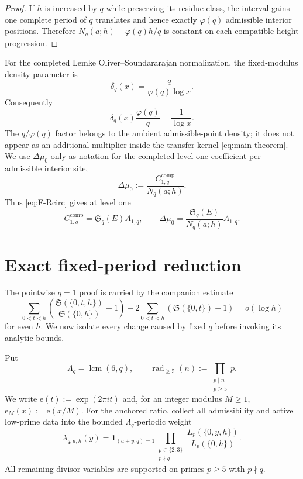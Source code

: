 \documentclass[11pt]{article}
\theoremstyle{definition}
\theoremstyle{remark}
\newcommand{\SSer}{\mathfrak S}
\newcommand{\1}{\mathbf 1}
\newcommand{\e}{\mathrm e}
\newcommand{\ph}{\varphi}
\begin{document}
\begin{proof}
If $h$ is increased by $q$ while preserving its residue class, the interval gains one complete period of $q$ translates and hence exactly $\ph(q)$ admissible interior positions.  Therefore $N_q(a;h)-\ph(q)h/q$ is constant on each compatible height progression.
\end{proof}

For the completed Lemke Oliver--Soundararajan normalization, the fixed-modulus density parameter is
\begin{equation}\label{eq:deltaq}
\delta_q(x)=\frac{q}{\ph(q)\log x}.
\end{equation}
Consequently
\[
\delta_q(x)\frac{\ph(q)}q=\frac1{\log x}.
\]
The $q/\ph(q)$ factor belongs to the ambient admissible-point density; it does not appear as an additional multiplier inside the transfer kernel \eqref{eq:main-theorem}.  We use $\Delta\mu_0$ only as notation for the completed level-one coefficient per admissible interior site,
\[
\Delta\mu_0:=\frac{C_{1,q}^{\mathrm{comp}}}{N_q(a;h)}.
\]
Thus \eqref{eq:F-Rcirc} gives at level one
\begin{equation}\label{eq:LOS-level-one}
C_{1,q}^{\mathrm{comp}}=\SSer_q(E)A_{1,q},
\qquad
\Delta\mu_0=\frac{\SSer_q(E)}{N_q(a;h)}A_{1,q}.
\end{equation}

\section{Exact fixed-period reduction}\label{sec:fixed-period}

The pointwise $q=1$ proof is carried by the companion estimate
\begin{equation}\label{eq:q1-input}
\sum_{0<t<h}\left(
\frac{\SSer(\{0,t,h\})}{\SSer(\{0,h\})}-1
\right)
-2\sum_{0<t<h}(\SSer(\{0,t\})-1)
=o(\log h)
\end{equation}
for even $h$.  We now isolate every change caused by fixed $q$ before invoking its analytic bounds.

Put
\[
\Lambda_q=\operatorname{lcm}(6,q),
\qquad
\operatorname{rad}_{\ge5}(n):=\prod_{\substack{p\mid n\\p\ge5}}p.
\]
We write $\e(t):=\exp(2\pi i t)$ and, for an integer modulus $M\ge1$,
$\e_M(x):=\e(x/M)$.  For the anchored ratio, collect all admissibility and active low-prime data into the bounded $\Lambda_q$-periodic weight
\begin{equation}\label{eq:lambdaq}
\lambda_{q,a,h}(y)
=\1_{(a+y,q)=1}
\prod_{\substack{p\in\{2,3\}\\p\nmid q}}
\frac{L_p(\{0,y,h\})}{L_p(\{0,h\})}.
\end{equation}
All remaining divisor variables are supported on primes $p\ge5$ with $p\nmid q$.
\end{document}
